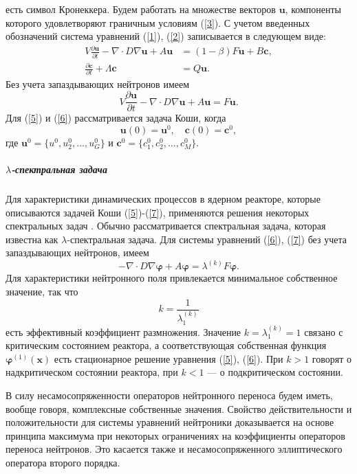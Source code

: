 \documentclass{crm-article}
\begin{document}
есть символ Кронеккера.
Будем работать на множестве векторов $\bm u$, компоненты которого удовлетворяют граничным условиям (\ref{3}).
С учетом введенных обозначений система уравнений (\ref{1}), (\ref{2}) записывается в следующем виде:
\begin{equation}\label{5}
\begin{split}
V \frac{\partial\bm{u}}{\partial t} -\nabla \cdot D \nabla \bm u  + A \bm{u} &=(1-\beta) F \bm{u} + B\bm c,
\\
\frac{\partial\bm c}{\partial t} + \Lambda \bm c &= Q \bm{u}. 
\end{split}
\end{equation}
Без учета запаздывающих нейтронов имеем
\begin{equation}\label{6}
V \frac{\partial\bm{u}}{\partial t} -\nabla \cdot D \nabla \bm{u}  + A \bm{u} = F \bm{u}.
\end{equation}  
Для (\ref{5}) и (\ref{6}) рассматривается задача Коши, когда
\begin{equation}\label{7}
 \bm u(0) = \bm u^0, \quad \bm c(0) = \bm c^0,
\end{equation} 
где $\bm u^0 = \{u^0,  u_2^0, ...,  u_G^0 \}$ и 
$\bm c^0 = \{ c_1^0,  c_2^0, ...,  c_M^0 \}$.

\subparagraph{$\lambda$-спектральная задача}
Для характеристики динамических процессов в ядерном реакторе, которые описываются задачей Коши (\ref{5})-(\ref{7}), применяются решения некоторых спектральных задач \cite{Bell1970,hetrick1971dynamics,stacey2007}.
Обычно рассматривается спектральная задача, которая известна как $\lambda$-спектральная задача.
Для системы уравнений (\ref{6}), (\ref{7}) без учета запаздывающих нейтронов, имеем
\begin{equation}\label{8}
-\nabla \cdot D \nabla \bm \varphi + A  \bm \varphi  = \lambda^{(k)} F \bm \varphi.
\end{equation}
Для характеристики нейтронного поля привлекается минимальное собственное значение, так что
\[
 k = \frac{1}{\lambda^{(k)}_1}  
\] 
есть эффективный коэффициент размножения.
Значение $k = \lambda^{(k)}_1 = 1$ связано с критическим состоянием реактора, а соответствующая собственная функция $\bm{\varphi}^{(1)}(\bm x)$ есть стационарное решение уравнения (\ref{5}), (\ref{6}).
При $k > 1$  говорят о надкритическом состоянии реактора, при $k < 1$  --- о подкритическом состоянии.

В силу несамосопряженности операторов нейтронного переноса будем иметь, вообще говоря, комплексные собственные значения.
Свойство действительности и положительности для системы уравнений нейтроники  доказывается на основе принципа максимума при некоторых ограничениях на коэффициенты операторов переноса нейтронов\cite{habetler1961existence}.
Это касается также и несамосопряженного эллиптического оператора второго порядка\cite{bookEvans}.
\end{document}
